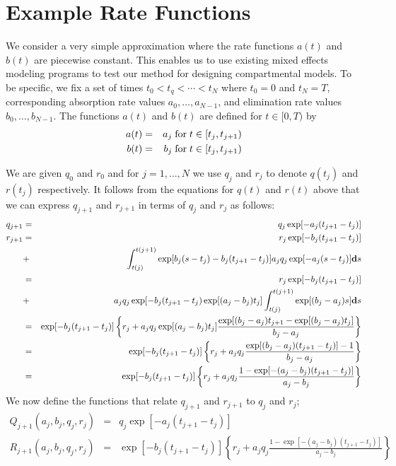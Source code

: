 \documentclass{article}
\newcommand{\B}[1]{{\bf #1}}
\newcommand{\R}[1]{{\rm #1}}
\begin{document}
\section{Example Rate Functions}
We consider a very simple approximation where the rate functions
\( a(t) \) and \( b(t) \) are piecewise constant.
This enables us to use existing mixed effects modeling programs
to test our method for designing compartmental models.
To be specific, 
we fix a set of times \( t_0 < t_q < \cdots < t_N \)
where \( t_0 = 0 \) and \( t_N = T \),
corresponding absorption rate values \( a_0 , \ldots , a_{N-1} \),
and elimination rate values \( b_0 , \ldots , b_{N-1} \).
The functions \( a(t) \) and \( b(t) \) are defined for 
\( t \in [0, T) \) by 
\begin{eqnarray*}
a (t) & = & a_j \; \R{for} \; t \in [ t_j , t_{j+1} )
\\
b (t) & = & b_j \; \R{for} \; t \in [ t_j , t_{j+1} )
\end{eqnarray*}

\noindent
We are given \( q_0 \) and \( r_0 \) and for \( j = 1 , \ldots , N \)
we use \( q_j \) and \( r_j \)
to denote \( q ( t_j ) \) and \( r ( t_j ) \) respectively.
It follows from the equations for \( q(t) \) and \( r(t) \) above that
we can express \( q_{j+1} \) and \( r_{j+1} \) in terms of \( q_j \)
and \( r_j \) as follows:
\begin{eqnarray*}
q_{j+1} 
& = & 
q_j \exp [ - a_j ( t_{j+1} - t_j ) ] 
\\
r_{j+1} 
& = & 
r_j \exp [ - b_j ( t_{j+1} - t_j ) ]
\\
& + &
\int_{t(j)}^{t(j+1)}
	\exp [ b_j ( s - t_j ) - b_j ( t_{j+1} - t_j ) ] 
		a_j q_j  \exp [ - a_j ( s - t_j ) ]
			\B{d} s
\\
& = &
r_j \exp [ - b_j ( t_{j+1} - t_j ) ]
\\
& + &
a_j q_j \exp [ - b_j ( t_{j+1} - t_j ) \exp [ (a_j - b_j ) t_j ] 
	\int_{t(j)}^{t(j+1)}
		\exp[ ( b_j - a_j ) s ]  
			\B{d} s
\\
& = &
\exp [ - b_j ( t_{j+1} - t_j ) ] \left\{ 
r_j
+
a_j q_j \exp [ (a_j - b_j ) t_j ]  
\frac{ \exp [ ( b_j - a_j ) t_{j+1} - \exp[ ( b_j - a_j ) t_j ]}{b_j - a_j}
\right\}
\\
& = &
\exp [ - b_j ( t_{j+1} - t_j ) ] \left\{ 
r_j
+
a_j q_j 
\frac{ \exp [ ( b_j - a_j ) ( t_{j+1} - t_j ) ] - 1 }{b_j - a_j}
\right\}
\\
& = &
\exp [ - b_j ( t_{j+1} - t_j ) ] \left\{ 
r_j
+
a_j q_j 
\frac{ 1 - \exp [ - ( a_j - b_j ) ( t_{j+1} - t_j ) ] }{a_j - b_j}
\right\}
\end{eqnarray*}
We now define the functions that relate \( q_{j+1} \) and \( r_{j+1} \)
to \( q_j \) and \( r_j \);
\begin{eqnarray*}
Q_{j+1} ( a_j , b_j , q_j , r_j ) 
& = &
q_j \exp [ - a_j ( t_{j+1} - t_j ) ] 
\\
R_{j+1} ( a_j , b_j , q_j , r_j ) 
& = &
\exp [ - b_j ( t_{j+1} - t_j ) ] \left\{ 
r_j
+
a_j q_j 
\frac{ 1 - \exp [ - ( a_j - b_j ) ( t_{j+1} - t_j ) ] }{a_j - b_j}
\right\}
\end{eqnarray*}
\end{document}
